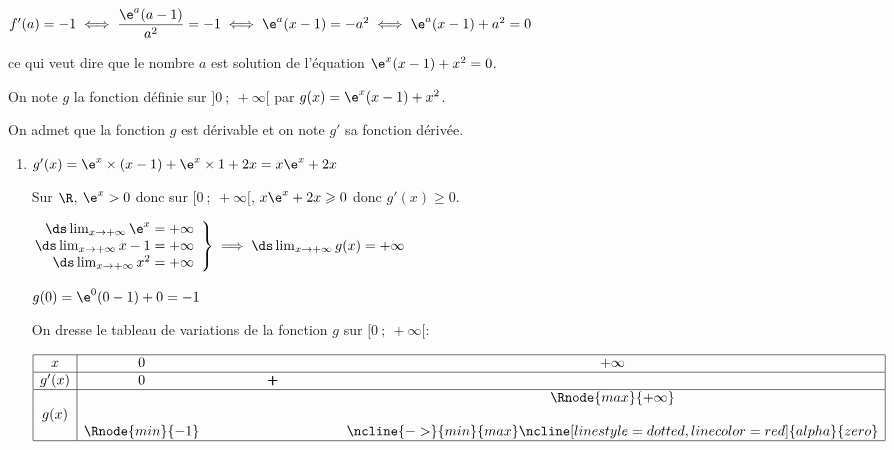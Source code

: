 \begin{enumerate}
\begin{enumerate}
$f'(a)=-1 \iff \dfrac{\e^{a} (a-1)}{a^2}=-1 \iff \e^{a} (x-1) = -a^2 \iff \e^{a}(x-1)+a^2=0$

ce qui veut dire que le nombre $a$ est solution de l'équation $\e^x(x - 1) + x^2  = 0$.
			\end{enumerate}
		
On note $g$ la fonction définie sur $]0~;~ +\infty[$ par $g(x) = \e^x(x - 1) + x^2 $.

On admet que la fonction $g$ est dérivable et on note $g'$ sa fonction dérivée.

\begin{enumerate}[resume]
		\item 
$g'(x)= \e^{x}\times (x-1) + \e^{x}\times 1 + 2x = x\e^{x}+2x$

Sur $\R$, $\e^{x}>0$ donc sur $[0~;~+\infty[$, $x\e^{x}+2x \geqslant 0$ donc $g'(x)\geqslant 0$.

$\left.
\begin{array}{@{} r}
\ds\lim_{x\to +\infty} \e^{x} = +\infty\\
\ds\lim_{x\to +\infty} x-1= +\infty\\
\ds\lim_{x\to +\infty} x^2 = +\infty
\end{array}
\right \rbrace
\implies
\ds\lim_{x\to +\infty} g(x) = +\infty$

$g(0)=\e^{0}(0-1)+0=-1$

On dresse le tableau de variations de la fonction $g$ sur $[0~;~+\infty[$:

\begin{center}
{\renewcommand{\arraystretch}{1.3}
     
     
\def\esp{\hspace*{3cm}}
     
\def\hauteur{0pt}
     
$\begin{array}{|c| *3{c}|}
\hline
 x & 0   & \esp & +\infty \\
 \hline
g'(x) & 0   & \pmb{+} & \\  
\hline
  &   &    & \Rnode{max}{+\infty}   \\
g(x) & &  &  \rule{0pt}{\hauteur} \\
 &     \Rnode{min}{-1} & & \rule{0pt}{\hauteur}
\ncline{->}{min}{max}
\ncline[linestyle=dotted, linecolor=red]{alpha}{zero}\\
\hline
\end{array}$
}
\end{center}


\end{enumerate}
\end{enumerate}
